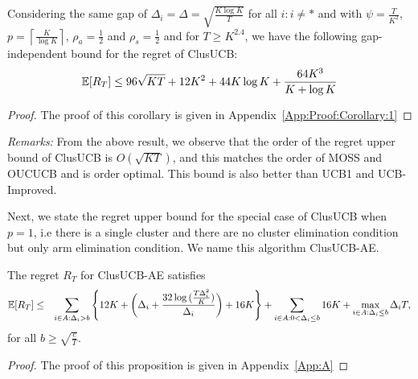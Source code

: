 

\begin{corollary}
\label{Result:Corollary:1}
Considering the same gap of $\Delta_{i} = \Delta =\sqrt{\frac{K\log K}{T}}$ for all ${i:i\neq *}$ and with $\psi=\frac{T}{K^2}$, $p=\left\lceil\frac{K}{\log K}\right\rceil$, $\rho_{a}=\frac{1}{2}$ and $\rho_{s}=\frac{1}{2}$ and for $T\geq K^{2.4}$, we have the following gap-independent bound for the regret of ClusUCB:
\begin{align*}
\mathbb{E}[R_{T}]\leq 96\sqrt{KT} + 12K^2 + 44K\log K + \dfrac{64 K^3}{K+\log K}
\end{align*}
\end{corollary}

\begin{proof}
The proof of this corollary is given in Appendix~\ref{App:Proof:Corollary:1}
\end{proof}

\textit{Remarks:} From the above result, we observe that the order of the regret upper bound of ClusUCB is $O(\sqrt{KT})$, and this matches the order of MOSS and OUCUCB and is order optimal. This  bound is also better than UCB1 and UCB-Improved. 

Next, we state the regret upper bound for the special case of ClusUCB when $p=1$, i.e there is a single cluster and there are no cluster elimination condition but only arm elimination condition. We name this algorithm ClusUCB-AE.


\begin{proposition}
\label{proofTheorem:Prop:1}
The regret $R_T$ for ClusUCB-AE satisfies
\begin{align*}
&\mathbb{E} [R_{T}]\leq &\sum\limits_{i\in A:\Delta_{i} > b} \left\lbrace 12K + \bigg(\Delta_{i}+\dfrac{32\log{(\frac{T\Delta_i^2}{K})}}{\Delta_{i}}\bigg) + 16K\right\rbrace +\sum\limits_{i\in A:0 < \Delta_{i}\leq b} 16K + \max_{i\in A:\Delta_{i}\leq b}\Delta_{i}T,
\end{align*}
for all $b\geq\sqrt{\frac{e}{T}}$.
\end{proposition}

\begin{proof}
The proof of this proposition is given in Appendix~\ref{App:A}
\end{proof}


